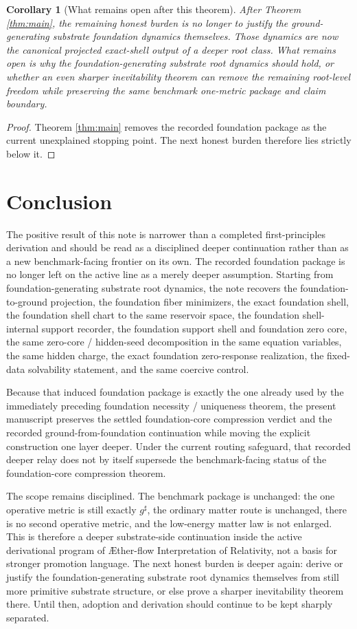 \documentclass[11pt]{article}
\newcommand{\Aflow}{\AE{}ther-flow}
\newcommand{\TheoryName}{\Aflow{} Interpretation of Relativity}
\newcommand{\CompletedMetric}{g^{\sharp}}
\newtheorem{corollary}{Corollary}
\begin{document}
\begin{corollary}[What remains open after this theorem]
\label{cor:next}
After Theorem \ref{thm:main}, the remaining honest burden is no longer to justify the ground-generating substrate foundation dynamics themselves. Those dynamics are now the canonical projected exact-shell output of a deeper root class. What remains open is why the foundation-generating substrate root dynamics should hold, or whether an even sharper inevitability theorem can remove the remaining root-level freedom while preserving the same benchmark one-metric package and claim boundary.
\end{corollary}

\begin{proof}
Theorem \ref{thm:main} removes the recorded foundation package as the current unexplained stopping point. The next honest burden therefore lies strictly below it.
\end{proof}

\section{Conclusion}

The positive result of this note is narrower than a completed first-principles derivation and should be read as a disciplined deeper continuation rather than as a new benchmark-facing frontier on its own. The recorded foundation package is no longer left on the active line as a merely deeper assumption. Starting from foundation-generating substrate root dynamics, the note recovers the foundation-to-ground projection, the foundation fiber minimizers, the exact foundation shell, the foundation shell chart to the same reservoir space, the foundation shell-internal support recorder, the foundation support shell and foundation zero core, the same zero-core / hidden-seed decomposition in the same equation variables, the same hidden charge, the exact foundation zero-response realization, the fixed-data solvability statement, and the same coercive control.

Because that induced foundation package is exactly the one already used by the immediately preceding foundation necessity / uniqueness theorem, the present manuscript preserves the settled foundation-core compression verdict and the recorded ground-from-foundation continuation while moving the explicit construction one layer deeper. Under the current routing safeguard, that recorded deeper relay does not by itself supersede the benchmark-facing status of the foundation-core compression theorem.

The scope remains disciplined. The benchmark package is unchanged: the one operative metric is still exactly \(\CompletedMetric\), the ordinary matter route is unchanged, there is no second operative metric, and the low-energy matter law is not enlarged. This is therefore a deeper substrate-side continuation inside the active derivational program of \TheoryName{}, not a basis for stronger promotion language. The next honest burden is deeper again: derive or justify the foundation-generating substrate root dynamics themselves from still more primitive substrate structure, or else prove a sharper inevitability theorem there. Until then, adoption and derivation should continue to be kept sharply separated.
\end{document}

